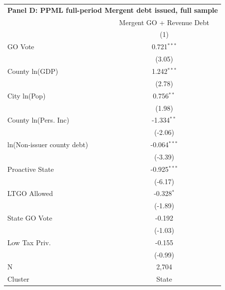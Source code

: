 \begingroup
\centering
\begin{tabular*}{\textwidth}{@{\extracolsep{\fill}}lc}
\multicolumn{2}{l}{\textbf{Panel D: PPML full-period Mergent debt issued, full sample}}\\

\addlinespace
   \toprule
                              & Mergent GO + Revenue Debt\\  
                              & (1)\\  
   \midrule 
   GO Vote                    & 0.721$^{***}$\\   
                              & (3.05)\\   
   County ln(GDP)             & 1.242$^{***}$\\   
                              & (2.78)\\   
   City ln(Pop)               & 0.756$^{**}$\\   
                              & (1.98)\\   
   County ln(Pers. Inc)       & -1.334$^{**}$\\   
                              & (-2.06)\\   
   ln(Non-issuer county debt) & -0.064$^{***}$\\   
                              & (-3.39)\\   
   Proactive State            & -0.925$^{***}$\\   
                              & (-6.17)\\   
   LTGO Allowed               & -0.328$^{*}$\\   
                              & (-1.89)\\   
   State GO Vote              & -0.192\\   
                              & (-1.03)\\   
   Low Tax Priv.              & -0.155\\   
                              & (-0.99)\\   
   \hline
   N               & 2,704\\  
   Cluster              & State\\  
   \bottomrule
\end{tabular*}
\par\endgroup
